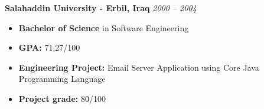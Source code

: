 \documentclass[11pt,a4paper]{article}
\begin{document}
\begin{list}{}{
  \setlength{\leftmargin}{0pt}
  \setlength{\labelwidth}{0pt}
  \setlength{\itemindent}{0pt}
  \setlength{\parsep}{0pt}
  \setlength{\itemsep}{1em} %
}
\item \textcolor{RedViolet}{\textbf{Salahaddin University - Erbil, Iraq}  \hfill \textit{2000 – 2004}} \vspace{0.5em}
      \begin{itemize}
          \item \textbf{Bachelor of Science} in Software Engineering
          \item \textbf{GPA:} 71.27/100
          \item \textbf{Engineering Project:} Email Server Application using Core Java Programming Language
          \item \textbf{Project grade:}  80/100 \\
      \end{itemize}
      
\end{list}
\end{document}
